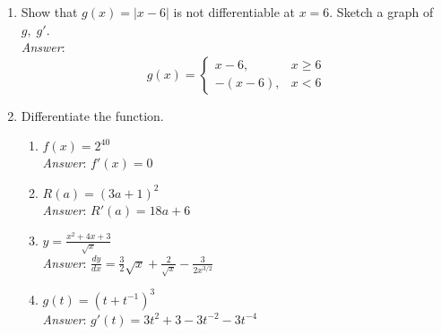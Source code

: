 \documentclass[11pt]{article}
\begin{document}
\begin{enumerate}
{\em Answer}: $g'(0)=\lim_{x\rightarrow 0}\frac{g(x)-g(0)}{x-0}=\lim_{x\rightarrow 0}\frac{1}{2\sqrt{x}}$, which does not exist. There is a vertical tangent at $x=0$.\\ 

\item Show that $g(x)=|x-6|$ is not differentiable at $x=6$. Sketch a graph of $g,\;g'$.\\

{\em Answer}: \[g(x)=\begin{cases}  x-6, & x\geq 6 \\ -(x-6), & x<6  \end{cases}\]



\item Differentiate the function.

\begin{enumerate}

\item $f(x)=2^{40}$\\

{\em Answer}: $f'(x)=0$\\

\item $R(a)=(3a+1)^2$\\

{\em Answer}: $R'(a)=18a+6$\\ 

\item $y=\frac{x^2+4x+3}{\sqrt{x}}$\\

{\em Answer}: $\frac{dy}{dx}=\frac{3}{2}\sqrt{x}+\frac{2}{\sqrt{x}}-\frac{3}{2x^{3/2}}$\\



\item $g(t)=(t+t^{-1})^3$\\

{\em Answer}: $g'(t)=3t^2+3-3t^{-2}-3t^{-4}$\\


\end{enumerate}
\end{enumerate}
\end{document}
